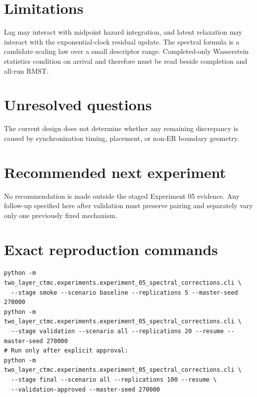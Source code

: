\documentclass[11pt]{article}
\begin{document}
\section{Limitations}
Lag may interact with midpoint hazard integration, and latent relaxation may
interact with the exponential-clock residual update. The spectral formula is a
candidate scaling law over a small descriptor range. Completed-only Wasserstein
statistics condition on arrival and therefore must be read beside completion and
all-run RMST.

\section{Unresolved questions}
The current design does not determine whether any remaining discrepancy is caused
by synchronization timing, placement, or non-ER boundary geometry.

\section{Recommended next experiment}
No recommendation is made outside the staged Experiment 05 evidence. Any follow-up
specified here after validation must preserve pairing and separately vary only one
previously fixed mechanism.

\section{Exact reproduction commands}
\begin{verbatim}
python -m two_layer_ctmc.experiments.experiment_05_spectral_corrections.cli \
  --stage smoke --scenario baseline --replications 5 --master-seed 270000
python -m two_layer_ctmc.experiments.experiment_05_spectral_corrections.cli \
  --stage validation --scenario all --replications 20 --resume --master-seed 270000
# Run only after explicit approval:
python -m two_layer_ctmc.experiments.experiment_05_spectral_corrections.cli \
  --stage final --scenario all --replications 100 --resume \
  --validation-approved --master-seed 270000
\end{verbatim}
\end{document}
